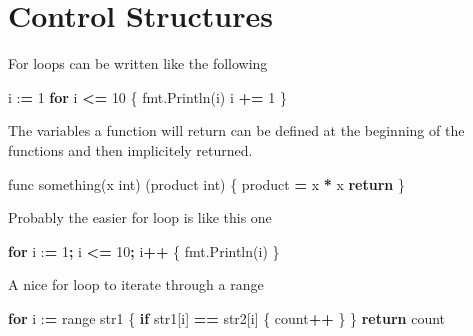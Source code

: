 \documentclass[]{book}
\newenvironment{Shaded}{\begin{snugshade}}{\end{snugshade}}
\newcommand{\BuiltInTok}[1]{#1}
\newcommand{\ControlFlowTok}[1]{\textcolor[rgb]{0.13,0.29,0.53}{\textbf{#1}}}
\newcommand{\DecValTok}[1]{\textcolor[rgb]{0.00,0.00,0.81}{#1}}
\newcommand{\NormalTok}[1]{#1}
\newcommand{\OperatorTok}[1]{\textcolor[rgb]{0.81,0.36,0.00}{\textbf{#1}}}
\begin{document}
\hypertarget{control-structures}{%
\section{Control Structures}\label{control-structures}}

For loops can be written like the following

\begin{Shaded}
\begin{Highlighting}[]
\NormalTok{i :}\OperatorTok{=} \DecValTok{1}
\ControlFlowTok{for}\NormalTok{ i }\OperatorTok{<=} \DecValTok{10}\NormalTok{ \{}
\NormalTok{    fmt.Println(i)}
\NormalTok{    i }\OperatorTok{+=} \DecValTok{1}
\NormalTok{\}}
\end{Highlighting}
\end{Shaded}

The variables a function will return can be defined at the beginning of the functions and then implicitely returned.

\begin{Shaded}
\begin{Highlighting}[]
\NormalTok{func something(x }\BuiltInTok{int}\NormalTok{) (product }\BuiltInTok{int}\NormalTok{) \{}
\NormalTok{    product }\OperatorTok{=}\NormalTok{ x }\OperatorTok{*}\NormalTok{ x}
    \ControlFlowTok{return}
\NormalTok{\}}
\end{Highlighting}
\end{Shaded}

Probably the easier for loop is like this one

\begin{Shaded}
\begin{Highlighting}[]
\ControlFlowTok{for}\NormalTok{ i :}\OperatorTok{=} \DecValTok{1}\OperatorTok{;}\NormalTok{ i }\OperatorTok{<=} \DecValTok{10}\OperatorTok{;}\NormalTok{ i}\OperatorTok{++}\NormalTok{ \{}
\NormalTok{    fmt.Println(i)}
\NormalTok{\}}
\end{Highlighting}
\end{Shaded}

A nice for loop to iterate through a range

\begin{Shaded}
\begin{Highlighting}[]
\ControlFlowTok{for}\NormalTok{ i :}\OperatorTok{=} \BuiltInTok{range}\NormalTok{ str1 \{}
    \ControlFlowTok{if}\NormalTok{ str1[i] }\OperatorTok{==}\NormalTok{ str2[i] \{ count}\OperatorTok{++}\NormalTok{ \}}
\NormalTok{\}}
\ControlFlowTok{return}\NormalTok{ count}
\end{Highlighting}
\end{Shaded}
\end{document}
